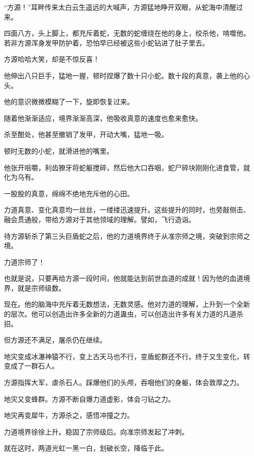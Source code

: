 
\begin{this_body}

“方源！”耳畔传来太白云生遥远的大喊声，方源猛地睁开双眼，从蛇海中清醒过来。

四面八方，头上脚上，都充斥着蛇，无数的蛇缠绕在他的身上，绞杀他，啃噬他。若非方源浑身发甲防护着，恐怕早已经被这些小蛇钻进了肚子里去。

方源哈哈大笑，却是不惊反喜！

他伸出八只巨手，猛地一握，顿时捏爆了数十只小蛇。数十段的真意，袭上他的心头。

他的意识微微模糊了一下，旋即恢复过来。

随着他渐渐适应，境界渐渐高深，他吸收真意的速度也愈来愈快。

杀至酣处，他甚至撤销了发甲，开动大嘴，猛地一吸。

顿时无数的小蛇，就滑进他的嘴里。

他张开咀嚼，利齿獠牙将蛇躯搅碎，然后他大口吞咽，蛇尸碎块刚刚化进食管，就化为乌有。

一股股的真意，绵绵不绝地充斥他的心田。

力道真意、变化真意均一丝丝，一缕缕迅速提升。这些提升的同时，也旁敲侧击、融会贯通般，带给方源对于其他领域的理解。譬如，飞行造诣。

待方源斩杀了第三头巨盾蛇之后，他的力道境界终于从准宗师之境，突破到宗师之境。

力道宗师了！

也就是说，只要再给方源一段时间，他就能达到前世血道的成就！因为他的血道境界，就是宗师级数。

现在。他的脑海中充斥着无数想法，无数灵感。他对力道的理解，上升到一个全新的层次。他可以创造出许多全新的力道蛊虫，可以创造出许多有关力道的凡道杀招。

但方源还不满足，屠杀仍在继续。

地灾变成冰瀑神猿不行，变上古天马也不行，变盾蛇群还不行。终于又生变化，转变成了一群石人。

方源指挥大军，虐杀石人。踩爆他们的头颅，吞咽他们的身躯，体会敦厚之力。

地灾又变蜂群。方源不断自爆力道虚影，体会刁钻之力。

地灾再变犀牛，方源杀之，感悟冲撞之力。

力道境界徐徐上升。稳固了宗师级后。向准宗师发起了冲刺。

就在这时，两道光虹一黑一白，划破长空，降临于此。


\end{this_body}
